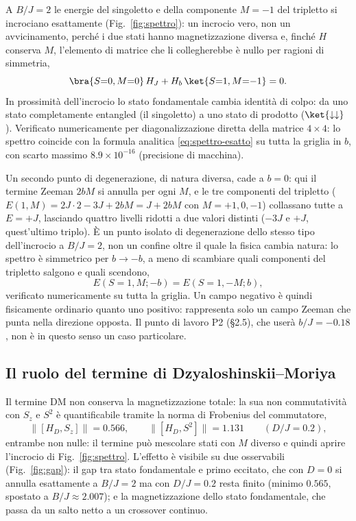 \documentclass[11pt,a4paper]{article}
\begin{document}
A $B/J=2$ le energie del singoletto e della componente $M=-1$ del
tripletto si incrociano esattamente (Fig.~\ref{fig:spettro}): un incrocio
vero, non un avvicinamento, perché i due stati hanno magnetizzazione
diversa e, finché $H$ conserva $M$, l'elemento di matrice che li
collegherebbe è nullo per ragioni di simmetria,
\begin{equation}
\bra{S{=}0,M{=}0}\,H_{J}+H_{b}\,\ket{S{=}1,M{=}{-}1} = 0.
\end{equation}
In prossimità dell'incrocio lo stato fondamentale cambia identità di colpo:
da uno stato completamente entangled (il singoletto) a uno stato di
prodotto ($\ket{\downarrow\downarrow}$). Verificato numericamente per
diagonalizzazione diretta della matrice $4\times4$: lo spettro coincide con
la formula analitica \eqref{eq:spettro-esatto} su tutta la griglia in $b$,
con scarto massimo $8.9\times10^{-16}$ (precisione di macchina).

Un secondo punto di degenerazione, di natura diversa, cade a $b=0$: qui il
termine Zeeman $2bM$ si annulla per ogni $M$, e le tre componenti del
tripletto ($E(1,M)=2J\cdot2-3J+2bM=J+2bM$ con $M=+1,0,-1$) collassano
tutte a $E=+J$, lasciando quattro livelli ridotti a due valori distinti
($-3J$ e $+J$, quest'ultimo triplo). È un punto isolato di degenerazione dello stesso
tipo dell'incrocio a $B/J=2$, non un confine oltre il quale la fisica
cambia natura: lo spettro è simmetrico per $b\to-b$, a meno di scambiare
quali componenti del tripletto salgono e quali scendono,
\begin{equation}
E(S{=}1,M;-b) = E(S{=}1,-M;b),
\end{equation}
verificato numericamente su tutta la griglia. Un campo negativo è quindi
fisicamente ordinario quanto uno positivo: rappresenta solo un campo
Zeeman che punta nella direzione opposta. Il punto di lavoro P2 (§2.5),
che userà $b/J=-0.18$, non è in questo senso un caso particolare.

\subsection{Il ruolo del termine di Dzyaloshinskii--Moriya}

Il termine DM non conserva la magnetizzazione totale: la sua non
commutatività con $S_z$ e $S^2$ è quantificabile tramite la norma di
Frobenius del commutatore,
\begin{equation}
\lVert [H_D, S_z] \rVert = 0.566, \qquad
\lVert [H_D, S^2] \rVert = 1.131 \qquad (D/J=0.2),
\end{equation}
entrambe non nulle: il termine può mescolare stati con $M$ diverso e quindi
aprire l'incrocio di Fig.~\ref{fig:spettro}. L'effetto è visibile su due
osservabili (Fig.~\ref{fig:gap}): il gap tra stato fondamentale e primo
eccitato, che con $D=0$ si annulla esattamente a $B/J=2$ ma con $D/J=0.2$
resta finito (minimo $0.565$, spostato a $B/J\approx2.007$); e la
magnetizzazione dello stato fondamentale, che passa da un salto netto a un
crossover continuo.
\end{document}
